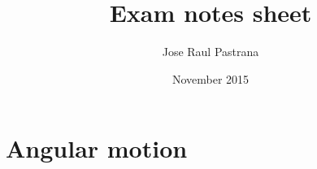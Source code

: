 \documentclass{article}
\title{Exam notes sheet}
\author{Jose Raul Pastrana }
\date{November 2015}
\begin{document}
\maketitle

\section{Angular motion}
\end{document}
